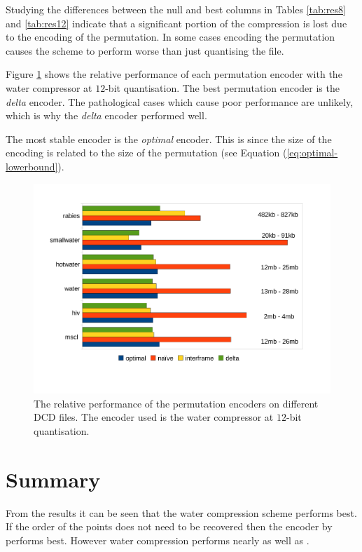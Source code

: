 \documentclass[a4paper]{report}
\begin{document}
Studying the differences between the null and best columns in Tables
\ref{tab:res8} and \ref{tab:res12} indicate that a significant portion of the
compression is lost due to the encoding of the permutation. In some cases
encoding the permutation causes the scheme to perform worse than just
quantising the file.

Figure \ref{fig:perm} shows the relative performance of each permutation
encoder with the water compressor at $12$-bit quantisation. The best
permutation encoder is the \emph{delta} encoder. The pathological cases which
cause poor performance are unlikely, which is why the \emph{delta} encoder
performed well.

The most stable encoder is the \emph{optimal} encoder. This is since the size
of the encoding is related to the size of the permutation (see Equation
(\ref{eq:optimal-lowerbound}).

\begin{figure}[h]
\centering
\includegraphics{images/perm}
\caption{The relative performance of the permutation encoders on different DCD
  files. The encoder used is the water compressor at $12$-bit quantisation.}
\label{fig:perm}
\end{figure}


\section{Summary}
\label{sec:summary}

From the results it can be seen that the water compression scheme performs
best. If the order of the points does not need to be recovered then the
encoder by \citet{gumholdcomp} performs best. However water compression
performs nearly as well as \citet{gumholdcomp}.
\end{document}
